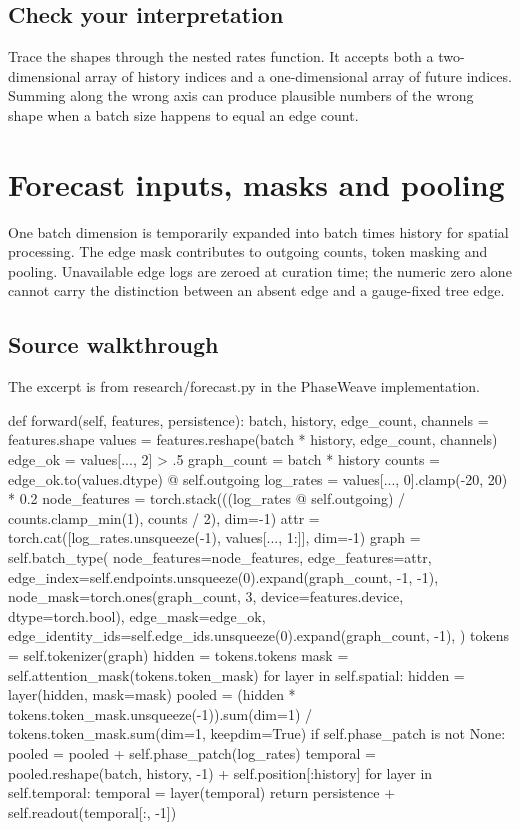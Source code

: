 \documentclass[11pt,oneside,openany]{book}
\begin{document}
\section*{Check your interpretation}
Trace the shapes through the nested rates function. It accepts both a two-dimensional array of history indices and a one-dimensional array of future indices. Summing along the wrong axis can produce plausible numbers of the wrong shape when a batch size happens to equal an edge count.

\chapter{Forecast inputs, masks and pooling}
One batch dimension is temporarily expanded into batch times history for spatial processing. The edge mask contributes to outgoing counts, token masking and pooling. Unavailable edge logs are zeroed at curation time; the numeric zero alone cannot carry the distinction between an absent edge and a gauge-fixed tree edge.

\section*{Source walkthrough}
The excerpt is from research/forecast.py in the PhaseWeave implementation.

\begin{BookCode}
def forward(self, features, persistence):
    batch, history, edge_count, channels = features.shape
    values = features.reshape(batch * history, edge_count, channels)
    edge_ok = values[..., 2] > .5
    graph_count = batch * history
    counts = edge_ok.to(values.dtype) @ self.outgoing
    log_rates = values[..., 0].clamp(-20, 20) * 0.2
    node_features = torch.stack(((log_rates @ self.outgoing) / counts.clamp_min(1), counts / 2), dim=-1)
    attr = torch.cat([log_rates.unsqueeze(-1), values[..., 1:]], dim=-1)
    graph = self.batch_type(
        node_features=node_features, edge_features=attr,
        edge_index=self.endpoints.unsqueeze(0).expand(graph_count, -1, -1),
        node_mask=torch.ones(graph_count, 3, device=features.device, dtype=torch.bool),
        edge_mask=edge_ok, edge_identity_ids=self.edge_ids.unsqueeze(0).expand(graph_count, -1),
    )
    tokens = self.tokenizer(graph)
    hidden = tokens.tokens
    mask = self.attention_mask(tokens.token_mask)
    for layer in self.spatial:
        hidden = layer(hidden, mask=mask)
    pooled = (hidden * tokens.token_mask.unsqueeze(-1)).sum(dim=1) / tokens.token_mask.sum(dim=1, keepdim=True)
    if self.phase_patch is not None:
        pooled = pooled + self.phase_patch(log_rates)
    temporal = pooled.reshape(batch, history, -1) + self.position[:history]
    for layer in self.temporal:
        temporal = layer(temporal)
    return persistence + self.readout(temporal[:, -1])
\end{BookCode}
\end{document}
